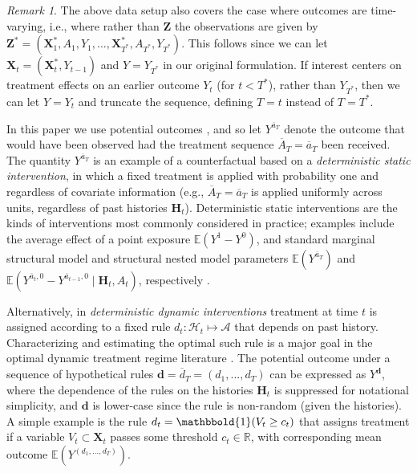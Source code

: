 \documentclass[12pt]{article}
\newcommand{\E}{\mathbb{E}}
\newcommand{\R}{\mathbb{R}}
\newcommand{\bZ}{\mathbf{Z}}
\newcommand{\bX}{\mathbf{X}}
\newcommand{\bH}{\mathbf{H}}
\newcommand{\one}{\mathbbold{1}}
\theoremstyle{remark}
\newtheorem{remark}{Remark}
\begin{document}
\begin{remark}
The above data setup also covers the case where outcomes are time-varying, i.e., where rather than $\bZ$ the observations are given by
$ \bZ^* = (\bX^*_1, A_1, Y_1,  ..., \bX^*_{T^*}, A_{T^*}, Y_{T^*})$. 
This follows since we can let $\bX_t = (\bX^*_t,Y_{t-1})$ and $Y=Y_{T^*}$ in our original formulation. If interest centers on treatment effects on an earlier outcome $Y_t$ (for $t<T^*$), rather than $Y_{T^*}$, then we can let $Y=Y_t$ and truncate the sequence, defining $T=t$ instead of $T=T^*$. 
\end{remark}

In this paper we use  potential outcomes \autocite{rubin1974estimating}, and so let $Y^{\overline{a}_T}$ denote the outcome that {would have} been observed had the treatment sequence $\overline{A}_T=\overline{a}_T$ been received. The quantity $Y^{\overline{a}_T}$ is an example of a counterfactual based on a \textit{deterministic static intervention}, in which a fixed treatment is applied with probability one and regardless of covariate information (e.g., $\overline{A}_T=\overline{a}_T$ is applied uniformly across units, regardless of past histories $\bH_t$). Deterministic static interventions are the kinds of interventions most commonly considered in practice; examples include the average effect of a point exposure $\E(Y^1-Y^0)$, and standard marginal structural model and structural nested model parameters $\E(Y^{\overline{a}_T})$ and $\E(Y^{\overline{a}_t,0} - Y^{\overline{a}_{t-1},0} \mid \bH_t,A_t)$, respectively \autocite{robins2000marginal, robins2000marginal2}. 

Alternatively, in \textit{deterministic dynamic interventions} \autocite{robins1986new, murphy2001marginal}  treatment at time $t$ is assigned according to a fixed rule $d_t: \mathcal{H}_t \mapsto \mathcal{A}$ that depends on past history. Characterizing and estimating the optimal such rule is a major goal in the optimal dynamic treatment regime literature \autocite{murphy2003optimal, robins2004optimal}. The potential outcome under a sequence of hypothetical rules $\textbf{d}=\overline{d}_T=(d_1,...,d_T)$ can be expressed as $Y^{\textbf{d}}$, where the dependence of the rules on the histories $\bH_t$ is suppressed for notational simplicity, and $\textbf{d}$ is lower-case since the rule is non-random (given the histories). A simple example is the rule $d_t = \one(V_t \geq c_t)$  that assigns treatment if a variable $V_t \subset \bX_t$ passes some threshold $c_t \in \R$, with corresponding mean outcome $\E(Y^{(d_1,...,d_T)})$.
\end{document}
